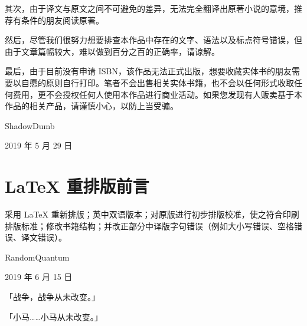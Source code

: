 其次，由于译文与原文之间不可避免的差异，无法完全翻译出原著小说的意境，推荐有条件的朋友阅读原著。

然后，尽管我们很努力想要排查本作品中存在的文字、语法以及标点符号错误，但由于文章篇幅较大，难以做到百分之百的正确率，请谅解。

最后，由于目前没有申请 ISBN，该作品无法正式出版，想要收藏实体书的朋友需要以自愿的原则自行打印。笔者不会出售相关实体书籍，也不会以任何形式收取任何费用，更不会授权任何人使用本作品进行商业活动。如果您发现有人贩卖基于本作品的相关产品，请谨慎小心，以防上当受骗。

\begin{flushright}
ShadowDumb

2019 年 5 月 29 日
\end{flushright}

\clearpage

\section*{\LaTeX{} 重排版前言}

采用 \LaTeX{} 重新排版；英中双语版本；对原版进行初步排版校准，使之符合印刷排版标准；修改书籍结构；并改正部分中译版字句错误（例如大小写错误、空格错误、译文错误）。

\begin{flushright}
RandomQuantum

2019 年 6 月 15 日
\end{flushright}


\begin{motto}
「战争，战争从未改变。」

\medskip

「小马……小马从未改变。」
\end{motto}

